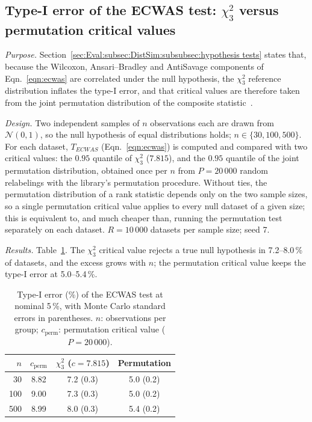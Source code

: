 \subsection{Type-I error of the ECWAS test: $\chi^2_3$ versus permutation critical values}
\label{supp:sim:ecwas_type1}

\textit{Purpose.} Section~\ref{sec:Eval:subsec:DistSim:subsubsec:hypothesis tests} states that, because the Wilcoxon, Ansari--Bradley and AntiSavage components of Eqn.~\ref{eqn:ecwas} are correlated under the null hypothesis, the $\chi^2_3$ reference distribution inflates the type-I error, and that critical values are therefore taken from the joint permutation distribution of the composite statistic~\cite{Kossler2019,Good2005}.

\textit{Design.} Two independent samples of $n$ observations each are drawn from $\mathcal{N}(0,1)$, so the null hypothesis of equal distributions holds; $n \in \{30, 100, 500\}$. For each dataset, $T_{ECWAS}$ (Eqn.~\ref{eqn:ecwas}) is computed and compared with two critical values: the $0.95$ quantile of $\chi^2_3$ ($7.815$), and the $0.95$ quantile of the joint permutation distribution, obtained once per $n$ from $P = 20\,000$ random relabelings with the library's permutation procedure. Without ties, the permutation distribution of a rank statistic depends only on the two sample sizes, so a single permutation critical value applies to every null dataset of a given size; this is equivalent to, and much cheaper than, running the permutation test separately on each dataset. $R = 10\,000$ datasets per sample size; seed 7.

\textit{Results.} Table~\ref{tab:supp:sim:ecwas_type1}. The $\chi^2_3$ critical value rejects a true null hypothesis in 7.2--8.0\,\% of datasets, and the excess grows with $n$; the permutation critical value keeps the type-I error at 5.0--5.4\,\%.

\begin{table}[htbp]
\centering
\caption{Type-I error (\%) of the ECWAS test at nominal 5\,\%, with Monte Carlo standard errors in parentheses. $n$: observations per group; $c_{\mathrm{perm}}$: permutation critical value ($P = 20\,000$).}
\label{tab:supp:sim:ecwas_type1}
\begin{tabular}{rccc}
\hline
$n$ & $c_{\mathrm{perm}}$ & $\chi^2_3$ ($c = 7.815$) & Permutation \\
\hline
30  & 8.82 & 7.2 (0.3) & 5.0 (0.2) \\
100 & 9.00 & 7.3 (0.3) & 5.0 (0.2) \\
500 & 8.99 & 8.0 (0.3) & 5.4 (0.2) \\
\hline
\end{tabular}
\end{table}

